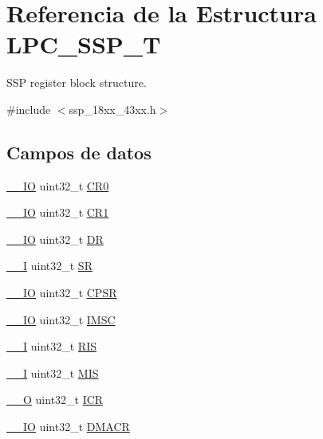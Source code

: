 \hypertarget{struct_l_p_c___s_s_p___t}{}\section{Referencia de la Estructura L\+P\+C\+\_\+\+S\+S\+P\+\_\+T}
\label{struct_l_p_c___s_s_p___t}


S\+SP register block structure.  




{\ttfamily \#include $<$ssp\+\_\+18xx\+\_\+43xx.\+h$>$}

\subsection*{Campos de datos}
\begin{DoxyCompactItemize}
\item 
\hyperlink{core__sc300_8h_aec43007d9998a0a0e01faede4133d6be}{\+\_\+\+\_\+\+IO} uint32\+\_\+t \hyperlink{struct_l_p_c___s_s_p___t_a8fe50f18067c0ecfea3157c1720a671f}{C\+R0}
\item 
\hyperlink{core__sc300_8h_aec43007d9998a0a0e01faede4133d6be}{\+\_\+\+\_\+\+IO} uint32\+\_\+t \hyperlink{struct_l_p_c___s_s_p___t_ab0ec7102960640751d44e92ddac994f0}{C\+R1}
\item 
\hyperlink{core__sc300_8h_aec43007d9998a0a0e01faede4133d6be}{\+\_\+\+\_\+\+IO} uint32\+\_\+t \hyperlink{struct_l_p_c___s_s_p___t_a3df0d8dfcd1ec958659ffe21eb64fa94}{DR}
\item 
\hyperlink{core__sc300_8h_af63697ed9952cc71e1225efe205f6cd3}{\+\_\+\+\_\+I} uint32\+\_\+t \hyperlink{struct_l_p_c___s_s_p___t_aa4e5f09c578d8d5c138b41a1e740df3f}{SR}
\item 
\hyperlink{core__sc300_8h_aec43007d9998a0a0e01faede4133d6be}{\+\_\+\+\_\+\+IO} uint32\+\_\+t \hyperlink{struct_l_p_c___s_s_p___t_a140588a82bafbf0bf0c983111aadb351}{C\+P\+SR}
\item 
\hyperlink{core__sc300_8h_aec43007d9998a0a0e01faede4133d6be}{\+\_\+\+\_\+\+IO} uint32\+\_\+t \hyperlink{struct_l_p_c___s_s_p___t_aadaeb8eaf11a1ac2952008e4f5aea459}{I\+M\+SC}
\item 
\hyperlink{core__sc300_8h_af63697ed9952cc71e1225efe205f6cd3}{\+\_\+\+\_\+I} uint32\+\_\+t \hyperlink{struct_l_p_c___s_s_p___t_aef20f9db3bdcf52941c8ac42f14a3c19}{R\+IS}
\item 
\hyperlink{core__sc300_8h_af63697ed9952cc71e1225efe205f6cd3}{\+\_\+\+\_\+I} uint32\+\_\+t \hyperlink{struct_l_p_c___s_s_p___t_ab93d8e22f60836895e96cc388310dd90}{M\+IS}
\item 
\hyperlink{core__sc300_8h_a7e25d9380f9ef903923964322e71f2f6}{\+\_\+\+\_\+O} uint32\+\_\+t \hyperlink{struct_l_p_c___s_s_p___t_afc0ed459ed55267df34cf3774e7c029d}{I\+CR}
\item 
\hyperlink{core__sc300_8h_aec43007d9998a0a0e01faede4133d6be}{\+\_\+\+\_\+\+IO} uint32\+\_\+t \hyperlink{struct_l_p_c___s_s_p___t_a082219a924d748e9c6092582aec06226}{D\+M\+A\+CR}
\end{DoxyCompactItemize}



